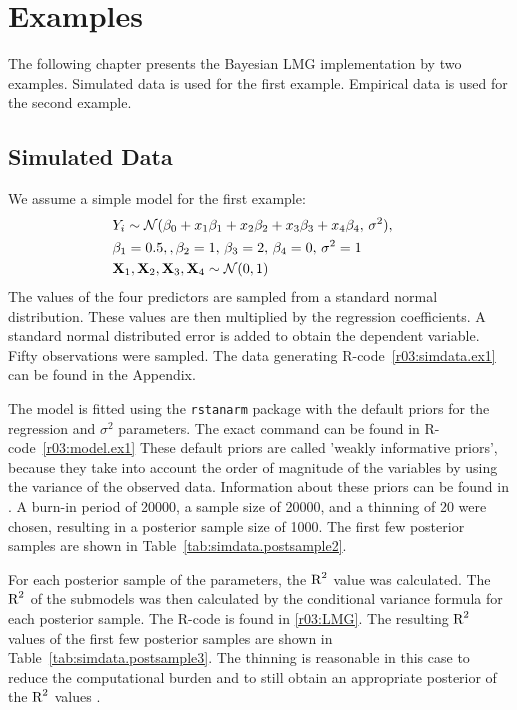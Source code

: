 \documentclass[11pt,a4paper,twoside]{book}
\begin{document}












\chapter{Examples}

The following chapter presents the Bayesian LMG implementation by two examples. Simulated data is used for the first example. Empirical data is used for the second example.

\section{Simulated Data}

We assume a simple model for the first example: 
\begin{align*} 
&Y_{i} \sim \mathcal{N}(\beta_{0}+x_{1} \beta_{1}+x_{2} \beta_{2}+x_{3} \beta_{3}+x_{4} \beta_{4}, \, \sigma^2),& \\ & \beta_{1} = 0.5, , \beta_{2} = 1, \, \beta_{3} = 2 , \, \beta_{4}=0, \, \sigma^2 = 1 & \\ & {\mathbf{X}}_{1}, {\mathbf{X}}_{2},{\mathbf{X}}_{3},{\mathbf{X}}_{4} \sim \mathcal{N}(0, 1) 
\end{align*} 
The values of the four predictors are sampled from a standard normal distribution. These values are then multiplied by the regression coefficients. A standard normal distributed error is added to obtain the dependent variable. Fifty observations were sampled. The data generating R-code~\ref{r03:simdata.ex1} can be found in the Appendix.




The model is fitted using the \texttt{rstanarm} package \citep{rstanarm} with the default priors for the regression and $\sigma^2$ parameters. The exact command can be found in R-code~\ref{r03:model.ex1} These default priors are called 'weakly informative priors', because they take into account the order of magnitude of the variables by using the variance of the observed data. Information about these priors can be found in \cite{stanM2017}. A burn-in period of 20000, a sample size of 20000, and a thinning of 20 were chosen, resulting in a posterior sample size of 1000. The first few posterior samples are shown in Table~\ref{tab:simdata.postsample2}. 

For each posterior sample of the parameters, the $\text{R}^2$ value was calculated. The $\text{R}^2$ of the submodels was then calculated by the conditional variance formula for each posterior sample. The R-code is found in \ref{r03:LMG}. The resulting $\text{R}^2$ values of the first few posterior samples are shown in Table~\ref{tab:simdata.postsample3}.  The thinning is reasonable in this case to reduce the computational burden and to still obtain an appropriate posterior of the $\text{R}^2$ values \citep{Link2012}. 
\end{document}
